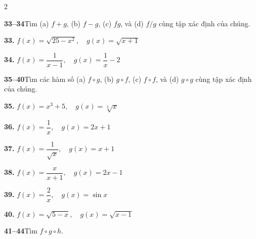 \enlargethispage{25pt}
\fancyhead[R]{}

\begin{multicols}{2}
\fontsize{7.6pt}{9.2pt}\selectfont
\setlength{\abovedisplayskip}{2pt}
\setlength{\belowdisplayskip}{2pt}

\noindent\textbf{\textsf{\color{stewartcyan}33--34}}\quad Tìm (a) $f + g$, (b) $f - g$, (c) $fg$, và (d) $f/g$ cùng tập xác định của chúng.

\vspace{1pt}
\noindent\textbf{33.} $f(x) = \sqrt{25 - x^2}, \quad g(x) = \sqrt{x + 1}$

\vspace{1pt}
\noindent\textbf{34.} $f(x) = \dfrac{1}{x - 1}, \quad g(x) = \dfrac{1}{x} - 2$

\vspace{3pt}
\noindent{\color{stewartcyan!60}\rule{\linewidth}{0.6pt}}
\vspace{3pt}

\noindent\textbf{\textsf{\color{stewartcyan}35--40}}\quad Tìm các hàm số (a) $f \circ g$, (b) $g \circ f$, (c) $f \circ f$, và (d) $g \circ g$ cùng tập xác định của chúng.

\vspace{1pt}
\noindent\textbf{35.} $f(x) = x^3 + 5, \quad g(x) = \sqrt[3]{x}$

\vspace{1pt}
\noindent\textbf{36.} $f(x) = \dfrac{1}{x}, \quad g(x) = 2x + 1$

\vspace{1pt}
\noindent\textbf{37.} $f(x) = \dfrac{1}{\sqrt{x}}, \quad g(x) = x + 1$

\vspace{1pt}
\noindent\textbf{38.} $f(x) = \dfrac{x}{x + 1}, \quad g(x) = 2x - 1$

\vspace{1pt}
\noindent\textbf{39.} $f(x) = \dfrac{2}{x}, \quad g(x) = \sin x$

\vspace{1pt}
\noindent\textbf{40.} $f(x) = \sqrt{5 - x}, \quad g(x) = \sqrt{x - 1}$

\vspace{3pt}
\noindent{\color{stewartcyan!60}\rule{\linewidth}{0.6pt}}
\vspace{3pt}

\noindent\textbf{\textsf{\color{stewartcyan}41--44}}\quad Tìm $f \circ g \circ h$.


\end{multicols}
